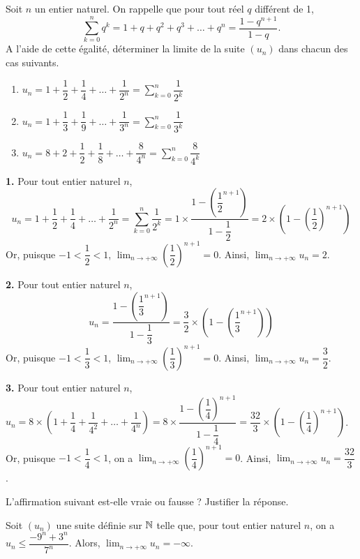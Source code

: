 \documentclass[11pt,fleqn, openany]{book} %
\begin{document}
\begin{exercise}Soit $n$ un entier naturel. On rappelle que pour tout réel $q$ différent de 1, 
\[\displaystyle \sum_{k=0}^{n}q^k= 1+q+q^2+q^3+\ldots + q^n=\dfrac{1-q^{n+1}}{1-q}.\]
A l'aide de cette égalité, déterminer la limite de la suite $(u_n)$ dans chacun des cas suivants.
\begin{enumerate}
\item  $u_n=1+\dfrac{1}{2}+\dfrac{1}{4}+\ldots+\dfrac{1}{2^n}=\displaystyle \sum_{k=0}^{n} \dfrac{1}{2^k} $ 
\item  $u_n=1+\dfrac{1}{3}+\dfrac{1}{9}+\ldots+\dfrac{1}{3^n}=\displaystyle \sum_{k=0}^{n} \dfrac{1}{3^k} $ 
\item $u_n=8+2+\dfrac{1}{2}+\dfrac{1}{8}+\ldots+\dfrac{8}{4^n}=\displaystyle \sum_{k=0}^{n} \dfrac{8}{4^k} $ 
\end{enumerate}\end{exercise}

\begin{solution}\textbf{1.} Pour tout entier naturel $n$, \[u_n = 1+\dfrac{1}{2}+\dfrac{1}{4}+\ldots + \dfrac{1}{2^n} = \sum_{k=0}^n \dfrac{1}{2^k}=1 \times \dfrac{1-\left(\dfrac{1}{2}^{n+1}\right)}{1-\dfrac{1}{2}}=2\times \left(1-\left(\dfrac{1}{2}\right)^{n+1}\right)\] Or, puisque $-1<\dfrac{1}{2}<1$, $\displaystyle \lim_{n \to +\infty} \left(\dfrac{1}{2}\right)^{n+1}=0$. Ainsi, $\displaystyle \lim_{n \to +\infty}u_n =2$.

\textbf{2.} Pour tout entier naturel $n$, \[u_n = \dfrac{1-\left(\dfrac{1}{3}^{n+1}\right)}{1-\dfrac{1}{3}}=\dfrac{3}{2} \times \left(1-\left(\dfrac{1}{3}^{n+1}\right)\right)\]
Or, puisque $-1<\dfrac{1}{3}<1$, $\displaystyle \lim_{n \to +\infty} \left(\dfrac{1}{3}\right)^{n+1}=0$. Ainsi, $\displaystyle \lim_{n \to +\infty}u_n=\dfrac{3}{2}$.

\textbf{3.} Pour tout entier naturel $n$, $u_n=8 \times \left(1+\dfrac{1}{4}+\dfrac{1}{4^2}+\ldots +\dfrac{1}{4^n}\right)=8\times \dfrac{1-\left(\dfrac{1}{4}\right)^{n+1}}{1-\dfrac{1}{4}}=\dfrac{32}{3} \times \left(1-\left(\dfrac{1}{4}\right)^{n+1}\right)$. Or, puisque $-1<\dfrac{1}{4}<1$, on a $\displaystyle \lim_{n \to +\infty} \left(\dfrac{1}{4}\right)^{n+1}=0$.
Ainsi, $\displaystyle \lim_{n \to +\infty}u_n =\dfrac{32}{3}$.
\end{solution}



\begin{exercise}[subtitle={(Asie 2024)}]
L'affirmation suivant est-elle vraie ou fausse ? Justifier la réponse.

Soit $(u_n)$ une suite définie sur $\mathbb{N}$ telle que, pour tout entier naturel $n$, on a $u_n\leqslant \dfrac{-9^n+3^n}{7^n}$. Alors, $\displaystyle\lim_{n \to +\infty}u_n=-\infty$.\end{exercise}
\end{document}
